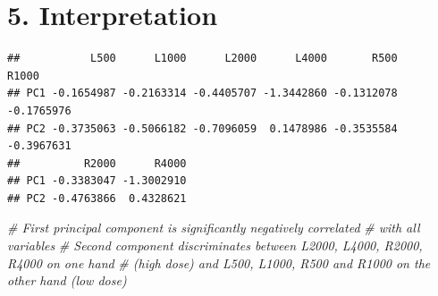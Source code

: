 \documentclass[]{article}
\newenvironment{Shaded}{\begin{snugshade}}{\end{snugshade}}
\newcommand{\KeywordTok}[1]{\textcolor[rgb]{0.13,0.29,0.53}{\textbf{#1}}}
\newcommand{\DataTypeTok}[1]{\textcolor[rgb]{0.13,0.29,0.53}{#1}}
\newcommand{\DecValTok}[1]{\textcolor[rgb]{0.00,0.00,0.81}{#1}}
\newcommand{\StringTok}[1]{\textcolor[rgb]{0.31,0.60,0.02}{#1}}
\newcommand{\CommentTok}[1]{\textcolor[rgb]{0.56,0.35,0.01}{\textit{#1}}}
\newcommand{\ControlFlowTok}[1]{\textcolor[rgb]{0.13,0.29,0.53}{\textbf{#1}}}
\newcommand{\OperatorTok}[1]{\textcolor[rgb]{0.81,0.36,0.00}{\textbf{#1}}}
\newcommand{\NormalTok}[1]{#1}
\begin{document}
\section{5. Interpretation}

\begin{Shaded}
\end{Shaded}

\begin{verbatim}
##           L500      L1000      L2000      L4000       R500      R1000
## PC1 -0.1654987 -0.2163314 -0.4405707 -1.3442860 -0.1312078 -0.1765976
## PC2 -0.3735063 -0.5066182 -0.7096059  0.1478986 -0.3535584 -0.3967631
##          R2000      R4000
## PC1 -0.3383047 -1.3002910
## PC2 -0.4763866  0.4328621
\end{verbatim}

\begin{Shaded}
\begin{Highlighting}[]
\CommentTok{# First principal component is significantly negatively correlated}
\CommentTok{# with all variables}
\CommentTok{# Second component discriminates between L2000, L4000, R2000, R4000 on one hand}
\CommentTok{# (high dose) and L500, L1000, R500 and R1000 on the other hand (low dose)}
\end{Highlighting}
\end{Shaded}
\end{document}
